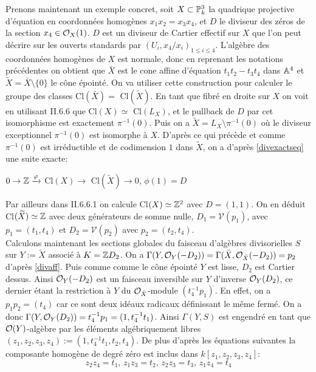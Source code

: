 Prenons maintenant un exemple concret, soit $X\subset \mathbb{P}^3_k$ la quadrique projective d'équation en coordonnées homogènes $x_1x_2=x_3x_4$, et $D$ le diviseur des zéros de la section $x_4\in\mathcal{O}_X(1)$. $D$ est un diviseur de Cartier effectif sur $X$ que l'on peut décrire sur les ouverts standards par $(U_i, x_4/x_i)_{1\leq i\leq 4}$. L'algèbre des coordonnées homogènes de $X$ est normale, donc en reprenant les notations précédentes on obtient que $\bar{X}$ est le cone affine d'équation $t_1t_2-t_3t_4$ dans $\mathbb{A}^4$ et $\widetilde{X}=\bar{X}\setminus\lbrace 0 \rbrace$ le cône épointé. On va utiliser cette construction pour calculer le groupe des classes Cl$(\bar{X})=$ Cl$(\widetilde{X})$. En tant que fibré en droite sur $X$ on voit en utilisant \cite{Hartshorne} II.6.6 que Cl$(X)\simeq$ Cl$(L_X)$, et le pullback de $D$ par cet isomorphisme est exactement $\pi^{-1}(0)$. Puis on a $\widetilde{X}=L_X \setminus \pi^{-1}(0)$ où le diviseur exceptionnel $\pi^{-1}(0)$ est isomorphe à $X$. D'après ce qui précède et comme $\pi^{-1}(0)$ est irréductible et de codimension $1$ dans $\widetilde{X}$, on a d'après \ref{divexactseq} une suite exacte:
\begin{center}
$ 0\rightarrow\mathbb{Z}\xrightarrow{\varphi}$ Cl$(X) \rightarrow$ Cl$(\widetilde{X}) \rightarrow 0$, $\phi(1)=D$
\end{center}
Par ailleurs dans \cite{Hartshorne} II.6.6.1 on calcule Cl$(X)\simeq \mathbb{Z}^2$ avec $D=(1,1)$. On en déduit Cl$(\widetilde{X})\simeq \mathbb{Z}$ avec deux générateurs de somme nulle, $D_1=\mathcal{V}(p_1)$, avec $p_1=(t_1,t_4)$ et $D_2=\mathcal{V}(p_2)$ avec $p_2=(t_2,t_4)$.\\ 
Calculons maintenant les sections globales du faisceau d'algèbres divisorielles $S$ sur $Y:=\widetilde{X}$ associé à $K=\mathbb{Z} D_2$. On a $\Gamma(Y, \mathcal{O}_Y(-D_2))=\Gamma(\bar{X}, \mathcal{O}_{\bar{X}}(-D_2))=p_2$ d'après \ref{divaff}. Puis comme comme le cône épointé $Y$ est lisse, $D_2$ est Cartier dessus. Ainsi $\mathcal{O}_Y(-D_2)$ est un faisceau inversible sur $Y$ d'inverse $\mathcal{O}_Y(D_2)$, ce dernier étant la restriction à $Y$ du $\mathcal{O}_{\bar{X}}$-module $(t_4^{-1}p_1)^{\widetilde{}}$. En effet, on a $p_1p_2=(t_4)$ car ce sont deux idéaux radicaux définissant le même fermé.  On a donc $\Gamma(Y, \mathcal{O}_Y(D_2))=t_4^{-1}p_1=(1, t_4^{-1}t_1)$. Ainsi $\Gamma(Y,S)$ est engendré en tant que $\mathcal{O}(Y)$-algèbre par les éléments algébriquement libres $(z_1,z_2,z_3,z_4):=(1, t_4^{-1}t_1,t_2,t_4)$. De plus d'après les équations suivantes la composante homogène de degré zéro est inclus dans $k[z_1,z_2,z_3,z_4]$:
$$ z_2z_4=t_1,\, z_1z_3=t_2,\, z_2z_3=t_3,\, z_1z_4=t_4$$

